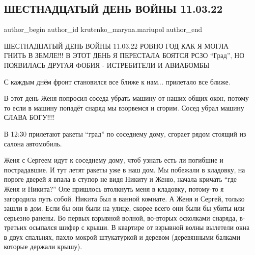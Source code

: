  
 
 
 
 

\subsection{ШЕСТНАДЦАТЫЙ ДЕНЬ ВОЙНЫ 11.03.22}
\label{sec:11_03_2023.fb.krutenko_maryna.mariupol.1.shestnadtsatii_den_v}

\ifcmt
 author_begin
   author_id krutenko_maryna.mariupol
 author_end
\fi

ШЕСТНАДЦАТЫЙ ДЕНЬ ВОЙНЫ 11.03.22 РОВНО ГОД КАК Я МОГЛА ГНИТЬ В ЗЕМЛЕ!!! В ЭТОТ
ДЕНЬ Я ПЕРЕСТАЛА БОЯТСЯ РСЗО \enquote{Град}, НО ПОЯВИЛАСЬ ДРУГАЯ ФОБИЯ - ИСТРЕБИТЕЛИ И
АВИАБОМБЫ 


С каждым днём фронт становился все ближе к нам... прилетало все ближе. 

В этот день Женя попросил соседа убрать машину от наших общих окон, потому-то
если в машину попадёт снаряд мы взорвемся и сгорим. Сосед убрал машину СЛАВА
БОГУ!!!! 

В 12:30 прилетают ракеты \enquote{град} по соседнему дому, сгорает рядом стоящий из
салона автомобиль. 

Женя с Сергеем идут к соседнему дому, чтоб узнать есть ли погибшие и
пострадавшие. И тут летят ракеты уже в наш дом. Мы побежали в кладовку, на
пороге дверей я впала в ступор не видя Никиту и Женю, начала кричать \enquote{где Женя
и Никита?} Оле пришлось втолкнуть меня в кладовку, потому-то я загородила путь
собой. Никита был в ванной комнате. А Женя и Сергей, только зашли в дом. Если
бы они были на улице, скорее всего они были бы убиты  или  серьезно ранены. Во
первых взрывной волной, во-вторых осколками снаряда, в-третьих осыпался шифер с
крыши. В квартире от взрывной волны вылетели окна в двух спальнях, пахло мокрой
штукатуркой и деревом (деревянными балками которые держали крышу).

